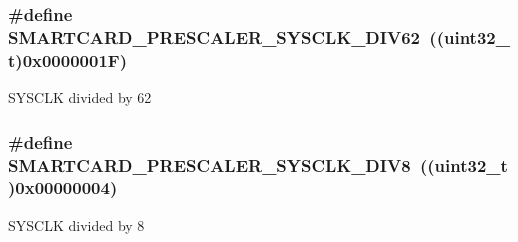 \subsubsection[{\texorpdfstring{S\+M\+A\+R\+T\+C\+A\+R\+D\+\_\+\+P\+R\+E\+S\+C\+A\+L\+E\+R\+\_\+\+S\+Y\+S\+C\+L\+K\+\_\+\+D\+I\+V62}{SMARTCARD_PRESCALER_SYSCLK_DIV62}}]{\setlength{\rightskip}{0pt plus 5cm}\#define S\+M\+A\+R\+T\+C\+A\+R\+D\+\_\+\+P\+R\+E\+S\+C\+A\+L\+E\+R\+\_\+\+S\+Y\+S\+C\+L\+K\+\_\+\+D\+I\+V62~((uint32\+\_\+t)0x0000001\+F)}\hypertarget{group___s_m_a_r_t_c_a_r_d___prescaler_gab8f6463ba19f798311457f4d537d3abb}{}\label{group___s_m_a_r_t_c_a_r_d___prescaler_gab8f6463ba19f798311457f4d537d3abb}
S\+Y\+S\+C\+LK divided by 62 
\subsubsection[{\texorpdfstring{S\+M\+A\+R\+T\+C\+A\+R\+D\+\_\+\+P\+R\+E\+S\+C\+A\+L\+E\+R\+\_\+\+S\+Y\+S\+C\+L\+K\+\_\+\+D\+I\+V8}{SMARTCARD_PRESCALER_SYSCLK_DIV8}}]{\setlength{\rightskip}{0pt plus 5cm}\#define S\+M\+A\+R\+T\+C\+A\+R\+D\+\_\+\+P\+R\+E\+S\+C\+A\+L\+E\+R\+\_\+\+S\+Y\+S\+C\+L\+K\+\_\+\+D\+I\+V8~((uint32\+\_\+t)0x00000004)}\hypertarget{group___s_m_a_r_t_c_a_r_d___prescaler_gadb83b5369c269a9f45150ca135293ed4}{}\label{group___s_m_a_r_t_c_a_r_d___prescaler_gadb83b5369c269a9f45150ca135293ed4}
S\+Y\+S\+C\+LK divided by 8 